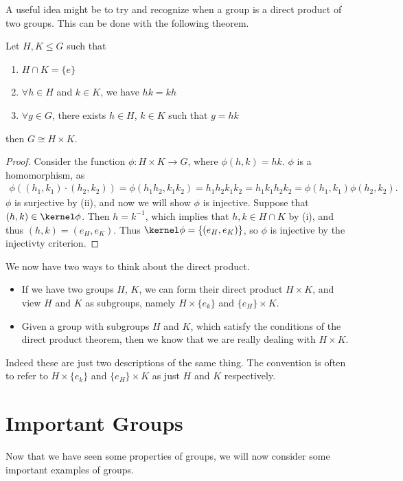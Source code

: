 \documentclass[a4]{scrreprt}
\newcommand{\newchapter}{\chapter}
\begin{document}
A useful idea might be to try and recognize when a group is a direct product of two groups. This can be done with the following theorem.

\begin{theorem}
	Let $H, K \leq G$ such that
	\begin{enumerate}[label=(\roman*)]
		\item $H \cap K = \{e\}$
		\item $\forall h \in H$ and $k \in K$, we have $hk = kh$
		\item $\forall g \in G$, there exists $h \in H$, $k \in K$ such that $g = hk$
	\end{enumerate}
	then $G \cong H \times K$.
\end{theorem}
% 
\begin{proof}
	Consider the function $\phi : H \times K \rightarrow G$, where $\phi(h, k) = hk$.
	$\phi$ is a homomorphism, as
	\begin{align*}
		\phi((h_1, k_1) \cdot (h_2, k_2)) = \phi(h_1 h_2, k_1 k_2) = h_1 h_2 k_1 k_2 = h_1 k_1 h_2 k_2 = \phi(h_1, k_1) \phi(h_2, k_2).
	\end{align*}
	$\phi$ is surjective by (ii), and now we will show $\phi$ is injective.
	Suppose that $(h, k) \in \kernel\phi$. Then $h = k^{-1}$, which implies that $h, k \in H \cap K$ by (i), and thus $(h, k) = (e_H, e_K)$. Thus $\kernel \phi = \{(e_H, e_K)\}$, so $\phi$ is injective by the injectivty criterion.
\end{proof}

We now have two ways to think about the direct product. 
\begin{itemize}
	\item If we have two groups $H$, $K$, we can form their direct product $H \times K$, and view $H$ and $K$ as subgroups, namely $H \times \{e_k\}$ and $\{e_H\} \times K$.
	\item Given a group with subgroups $H$ and $K$, which satisfy the conditions of the direct product theorem, then we know that we are really dealing with $H \times K$.
\end{itemize}
Indeed these are just two descriptions of the same thing. The convention is often to refer to $H \times \{e_k\}$ and $\{e_H\} \times K$ as just $H$ and $K$ respectively.

\newchapter{Important Groups}

Now that we have seen some properties of groups, we will now consider some important examples of groups.
\end{document}
